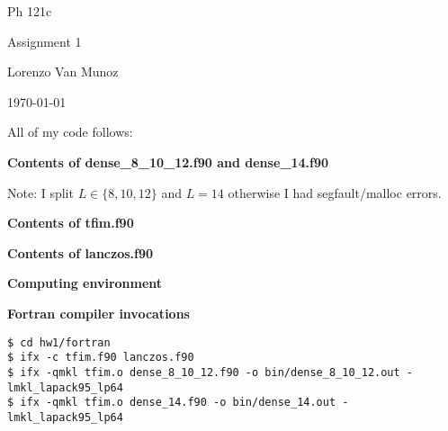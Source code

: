 \documentclass{article}
\begin{document}
{\centering

Ph 121c

Assignment 1

Lorenzo Van Munoz

\today

}

\newpage


All of my code follows:

\newpage

{\bf \noindent
Contents of dense\_8\_10\_12.f90 and dense\_14.f90
}

Note: I split $L \in \{8, 10, 12\}$ and $L=14$ otherwise
I had segfault/malloc errors.





\newpage

{\bf \noindent
Contents of tfim.f90
}



\newpage

{\bf \noindent
Contents of lanczos.f90
}



\newpage

{\bf \noindent
Computing environment
}




{\bf \noindent
Fortran compiler invocations
}

\begin{lstlisting}
$ cd hw1/fortran
$ ifx -c tfim.f90 lanczos.f90
$ ifx -qmkl tfim.o dense_8_10_12.f90 -o bin/dense_8_10_12.out -lmkl_lapack95_lp64
$ ifx -qmkl tfim.o dense_14.f90 -o bin/dense_14.out -lmkl_lapack95_lp64
\end{lstlisting}
\end{document}
